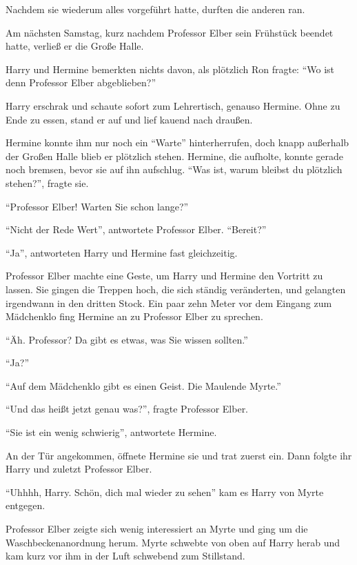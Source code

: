 Nachdem sie wiederum alles vorgeführt hatte, durften die anderen ran.

\trenn

Am nächsten Samstag, kurz nachdem Professor Elber sein Frühstück beendet hatte, verließ er die Große Halle.

Harry und Hermine bemerkten nichts davon, als plötzlich Ron fragte: \enquote{Wo ist denn Professor Elber abgeblieben?}

Harry erschrak und schaute sofort zum Lehrertisch, genauso Hermine. Ohne zu Ende zu essen, stand er auf und lief kauend nach draußen.

Hermine konnte ihm nur noch ein \enquote{Warte} hinterherrufen, doch knapp außerhalb der Großen Halle blieb er plötzlich stehen. Hermine, die aufholte, konnte gerade noch bremsen, bevor sie auf ihn aufschlug. \enquote{Was ist, warum bleibst du plötzlich stehen?}, fragte sie.

\enquote{Professor Elber! Warten Sie schon lange?}

\enquote{Nicht der Rede Wert}, antwortete Professor Elber. \enquote{Bereit?}

\enquote{Ja}, antworteten Harry und Hermine fast gleichzeitig.

Professor Elber machte eine Geste, um Harry und Hermine den Vortritt zu lassen. Sie gingen die Treppen hoch, die sich ständig veränderten, und gelangten irgendwann in den dritten Stock. Ein paar zehn Meter vor dem Eingang zum Mädchenklo fing Hermine an zu Professor Elber zu sprechen.

\enquote{Äh. Professor? Da gibt es etwas, was Sie wissen sollten.}

\enquote{Ja?}

\enquote{Auf dem Mädchenklo gibt es einen Geist. Die Maulende Myrte.}

\enquote{Und das heißt jetzt genau was?}, fragte Professor Elber.

\enquote{Sie ist ein wenig schwierig}, antwortete Hermine.

An der Tür angekommen, öffnete Hermine sie und trat zuerst ein. Dann folgte ihr Harry und zuletzt Professor Elber.

\enquote{Uhhhh, Harry. Schön, dich mal wieder zu sehen} kam es Harry von Myrte entgegen.

Professor Elber zeigte sich wenig interessiert an Myrte und ging um die Waschbeckenanordnung herum. Myrte schwebte von oben auf Harry herab und kam kurz vor ihm in der Luft schwebend zum Stillstand.

